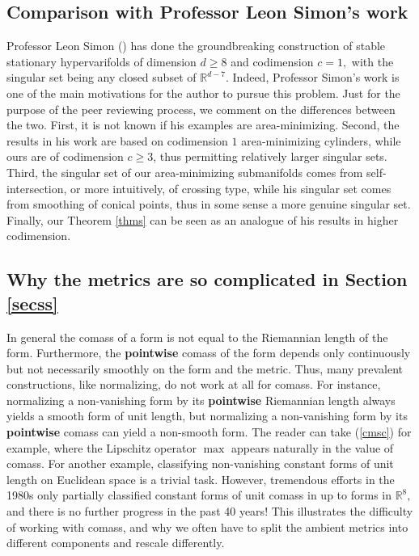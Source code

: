 \documentclass[11pt,a4paper]{amsart}
\numberwithin{equation}{section}
\newcommand{\R}{\mathbb{R}}
\theoremstyle{plain}
\theoremstyle{definition}
\numberwithin{equation}{subsection}
\begin{document}
\subsection{Comparison with Professor Leon Simon's work}\label{ls}
Professor Leon Simon (\cite{LSfr}) has done the groundbreaking construction of stable stationary hypervarifolds of dimension $d\ge 8$ and codimension $c=1,$ with the singular set being any closed subset of $\R^{d-7}$. Indeed, Professor Simon's work is one of the main motivations for the author to pursue this problem. Just for the purpose of the peer reviewing process, we comment on the differences between the two. First, it is not known if his examples are area-minimizing.  Second, the results in his work are based on codimension $1$ area-minimizing cylinders, while ours are of codimension $c\ge 3$, thus permitting relatively larger singular sets. Third, the singular set of our area-minimizing submanifolds comes from self-intersection, or more intuitively, of crossing type, while his singular set comes from smoothing of conical points, thus in some sense a more genuine singular set. Finally, our Theorem \ref{thms} can be seen as an analogue of his results in higher codimension.
\subsection{Why the metrics are so complicated in Section \ref{secss}}
In general the comass of a form is not equal to the Riemannian length of the form. Furthermore, the \textbf{pointwise} comass of the form depends only continuously but not necessarily smoothly on the form and the metric. Thus, many prevalent constructions, like normalizing, do not work at all for comass. For instance, normalizing a non-vanishing form by its  \textbf{pointwise} Riemannian length always yields a smooth form of unit length, but normalizing a non-vanishing form by its \textbf{pointwise} comass can yield a non-smooth form. The reader can take (\ref{cmsc}) for example, where the Lipschitz operator $\max$ appears naturally in the value of comass. For another example, classifying non-vanishing constant forms of unit length on Euclidean space is a trivial task. However, tremendous efforts in the 1980s only {partially} classified constant forms of unit comass in \cite{DHM} up to forms in $\R^8,$ and there is no further progress in the {past 40 years}! This illustrates the difficulty of working with comass, and why we often have to split the ambient metrics into different components and rescale differently.
\end{document}

